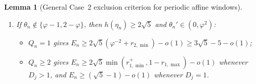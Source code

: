 \documentclass[11pt]{amsart}
\newtheorem{lemma}[theorem]{Lemma}
\theoremstyle{definition}
\theoremstyle{remark}
\numberwithin{equation}{section}
\begin{document}
\begin{lemma}[General Case~2 exclusion criterion for periodic affine windows]
\begin{enumerate}
\begin{itemize}
  \item $Q_n\ge b_j+1$ gives
        $E_n\ge\frac{2}{\sqrt5}(3-\varphi-r_{1,\max})-o(1)$.
  \end{itemize}
\item[(c)] If $\theta_n\notin\{\varphi-1,2-\varphi\}$, then $h(\eta_n)\ge2\sqrt5$
      and $\theta_n'\in(0,\varphi^2)$:
  \begin{itemize}
  \item $Q_n=1$ gives $E_n\ge2\sqrt5(\varphi^{-2}+r_{2,\min})-o(1)\ge3\sqrt5-5-o(1)$;
  \item $Q_n\ge2$ gives $E_n\ge2\sqrt5\min(r_{1,\min}^+,1-r_{1,\max})-o(1)$
        whenever $D_j>1$, and $E_n\ge(\sqrt5-1)-o(1)$ whenever $D_j=1$.
  \end{itemize}
\end{enumerate}
\end{lemma}
\end{document}
